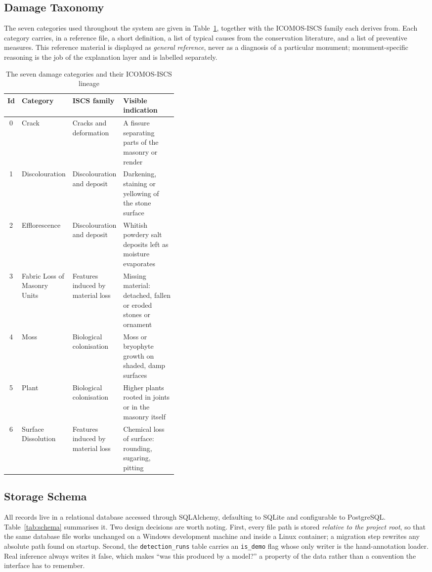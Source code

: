 \documentclass[a4paper,12pt,oneside]{book}
\begin{document}
\subsection{Damage Taxonomy}
The seven categories used throughout the system are given in Table~\ref{tab:classes}, together with the ICOMOS-ISCS family each derives from. Each category carries, in a reference file, a short definition, a list of typical causes from the conservation literature, and a list of preventive measures. This reference material is displayed as \textit{general reference}, never as a diagnosis of a particular monument; monument-specific reasoning is the job of the explanation layer and is labelled separately.

\begin{table}[H]
\centering
\caption{The seven damage categories and their ICOMOS-ISCS lineage}
\label{tab:classes}
\renewcommand{\arraystretch}{1.2}
{\footnotesize
\begin{tabular}{|c|l|l|p{0.40\linewidth}|}
\hline
\textbf{Id} & \textbf{Category} & \textbf{ISCS family} & \textbf{Visible indication} \\ \hline
0 & Crack & Cracks and deformation & A fissure separating parts of the masonry or render \\ \hline
1 & Discolouration & Discolouration and deposit & Darkening, staining or yellowing of the stone surface \\ \hline
2 & Efflorescence & Discolouration and deposit & Whitish powdery salt deposits left as moisture evaporates \\ \hline
3 & Fabric Loss of Masonry Units & Features induced by material loss & Missing material: detached, fallen or eroded stones or ornament \\ \hline
4 & Moss & Biological colonisation & Moss or bryophyte growth on shaded, damp surfaces \\ \hline
5 & Plant & Biological colonisation & Higher plants rooted in joints or in the masonry itself \\ \hline
6 & Surface Dissolution & Features induced by material loss & Chemical loss of surface: rounding, sugaring, pitting \\ \hline
\end{tabular}}
\end{table}

\subsection{Storage Schema}
All records live in a relational database accessed through SQLAlchemy, defaulting to SQLite and configurable to PostgreSQL. Table~\ref{tab:schema} summarises it. Two design decisions are worth noting. First, every file path is stored \textit{relative to the project root}, so that the same database file works unchanged on a Windows development machine and inside a Linux container; a migration step rewrites any absolute path found on startup. Second, the \texttt{detection\_runs} table carries an \texttt{is\_demo} flag whose only writer is the hand-annotation loader. Real inference always writes it false, which makes ``was this produced by a model?'' a property of the data rather than a convention the interface has to remember.
\end{document}
